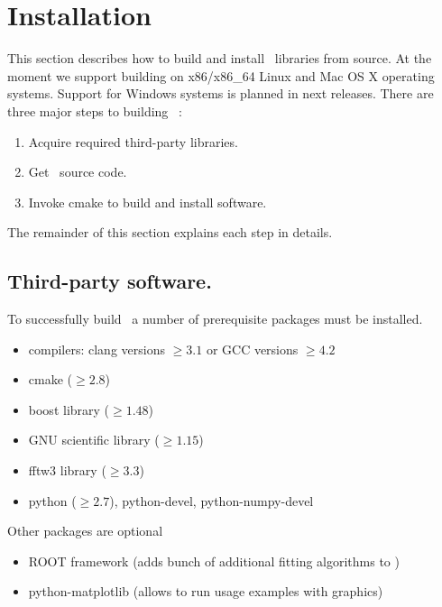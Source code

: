 \newpage
\section{Installation} 

This section describes how to build and install \BornAgain\ libraries from source.
At the moment we support building on x86/x86\_64 Linux and Mac OS X operating systems.
Support for Windows systems is planned in next releases.
There are three major steps to building \BornAgain\ :
\begin{enumerate}[1.]
\item Acquire required third-party libraries.
\item Get \BornAgain\ source code.
\item Invoke cmake to build and install software.
\end{enumerate}
The remainder of this section explains each step in details.

\subsection{Third-party software.}
To successfully build \BornAgain\ a number of prerequisite packages must be installed.

\begin{itemize}
\item compilers: clang  versions $\geq 3.1$ or GCC versions $\geq 4.2$
\item cmake ($\geq 2.8$)
\item boost library ($\geq 1.48$)
\item GNU scientific library ($\geq 1.15$)
\item fftw3 library ($\geq 3.3$)
\item python ($\geq 2.7$), python-devel, python-numpy-devel
\end{itemize}
\vspace*{2mm}

Other packages are optional
\begin{itemize}
\item ROOT framework (adds bunch of additional fitting algorithms to \BornAgain)
\item python-matplotlib (allows to run usage examples with graphics)
\end{itemize}

